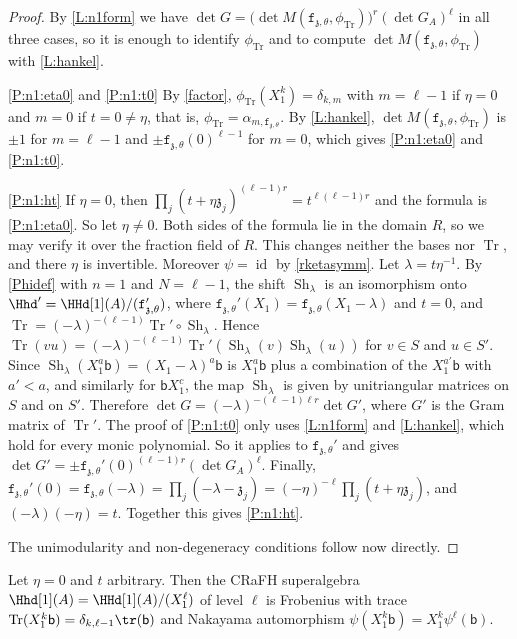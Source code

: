 \documentclass[a4paper,11pt]{amsart}
\newcommand{\Tr}{\op{Tr}}
\numberwithin{equation}{subsection}
\theoremstyle{definition}
\theoremstyle{theorem}
\theoremstyle{remark}
\newcommand\charge{{\mathfrak{z}}}
\newcommand\kapp{{\mathfrak{z}}}
\newcommand\fct{\mathtt{f}_{\charge,\theta}}
\newcommand\Sh[1][\lambda]{\op{Sh}_{#1}}
\newcommand\bb{\mathsf{b}}
\newcommand\op{\operatorname}
\begin{document}
\begin{proof}
  By \autoref{L:n1form} we have
  $\det G=\bigl(\det M(\fct,\phi_{\Tr})\bigr)^{r}(\det G_A)^{\ell}$ in all three cases, so it is
  enough to identify $\phi_{\Tr}$ and to compute $\det M(\fct,\phi_{\Tr})$ with
  \autoref{L:hankel}.

  \autoref{P:n1:eta0} and \autoref{P:n1:t0} By \autoref{factor}, $\phi_{\Tr}(X_1^{k})=\delta_{k,m}$ with $m=\ell-1$ if $\eta=0$ and $m=0$ if $t=0\neq\eta$, that is, $\phi_{\Tr}=\alpha_{m,\fct}$. By \autoref{L:hankel}, $\det M(\fct,\phi_{\Tr})$ is $\pm1$ for $m=\ell-1$ and $\pm\fct(0)^{\ell-1}$ for $m=0$, which gives \autoref{P:n1:eta0} and \autoref{P:n1:t0}.

  \autoref{P:n1:ht} If $\eta=0$, then $\prod_j(t+\eta\kapp_j)^{(\ell-1)r}=t^{\ell(\ell-1)r}$ and the formula is \autoref{P:n1:eta0}. So let $\eta\neq0$. Both sides of the formula lie in the domain $R$, so we may verify it over the fraction field of $R$. This changes neither the bases nor $\Tr$, and there $\eta$ is invertible. Moreover $\psi=\op{id}$ by \autoref{rketasymm}. Let $\lambda=t\eta^{-1}$. By \autoref{Phidef} with $n=1$ and $N=\ell-1$, the shift $\Sh$ is an isomorphism onto ${\Hhd}'=\HHd[1](A)/(\fct')$, where $\fct'(X_1)=\fct(X_1-\lambda)$ and $t=0$, and $\Tr=(-\lambda)^{-(\ell-1)}\Tr'\circ\Sh$. Hence $\Tr(vu)=(-\lambda)^{-(\ell-1)}\Tr'(\Sh(v)\Sh(u))$ for $v\in S$ and $u\in S'$. Since $\Sh(X_1^{a}\bb)=(X_1-\lambda)^{a}\bb$ is $X_1^a\bb$ plus a combination of the $X_1^{a'}\bb$ with $a'<a$, and similarly for $\bb X_1^c$, the map $\Sh$ is given by unitriangular matrices on $S$ and on $S'$. Therefore $\det G=(-\lambda)^{-(\ell-1)\ell r}\det G'$, where $G'$ is the Gram matrix of $\Tr'$. The proof of \autoref{P:n1:t0} only uses \autoref{L:n1form} and \autoref{L:hankel}, which hold for every monic polynomial. So it applies to $\fct'$ and gives $\det G'=\pm\fct'(0)^{(\ell-1)r}(\det G_A)^{\ell}$. Finally, $\fct'(0)=\fct(-\lambda)=\prod_j(-\lambda-\kapp_j)=(-\eta)^{-\ell}\prod_j(t+\eta\kapp_j)$, and $(-\lambda)(-\eta)=t$. Together this gives \autoref{P:n1:ht}.

The unimodularity and non-degeneracy conditions follow now directly.
\end{proof}

\begin{Corollary}\label{L:Aprime}
  Let $\eta=0$ and $t$ arbitrary. Then the CRaFH superalgebra  $\Hhd[1](A)=\HHd[1](A)/(X_1^{\ell})$ of  level $\ell$ is Frobenius with trace $\Tr(X_1^{k}\bb)=\delta_{k,\ell-1}\tr(\bb)$ and Nakayama automorphism
  $\psi(X_1^{k}\bb)=X_1^{k}\psi^{\ell}(\bb)$.
\end{Corollary}
\end{document}
